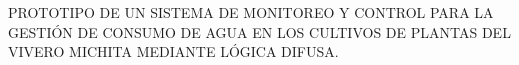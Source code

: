 \begin{nohyphens}
	\uppercase{ Prototipo de un Sistema de Monitoreo y Control para la gestión de consumo de agua en los cultivos de plantas del Vivero Michita mediante Lógica Difusa.}
\end{nohyphens}
